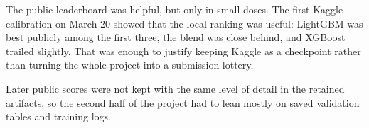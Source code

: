 The public leaderboard was helpful, but only in small doses. The first Kaggle calibration on March 20 showed that the local ranking was useful: LightGBM was best publicly among the first three, the blend was close behind, and XGBoost trailed slightly. That was enough to justify keeping Kaggle as a checkpoint rather than turning the whole project into a submission lottery.

Later public scores were not kept with the same level of detail in the retained artifacts, so the second half of the project had to lean mostly on saved validation tables and training logs.
